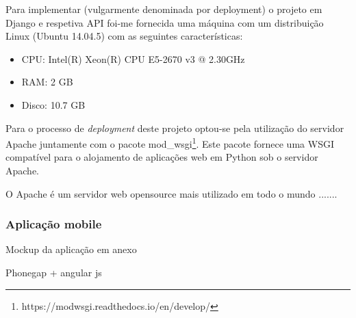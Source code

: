 Para implementar (vulgarmente denominada por deployment) o projeto em Django e respetiva API foi-me fornecida uma máquina com um distribuição Linux (Ubuntu 14.04.5) com as seguintes características: 

\begin{itemize}
	\item \ac{CPU}: Intel(R) Xeon(R) CPU E5-2670 v3 @ 2.30GHz
	\item \ac{RAM}: 2 GB
	\item Disco: 10.7 GB
\end{itemize}


Para o processo de \textit{deployment} deste projeto optou-se pela utilização do servidor Apache juntamente com o pacote mod\_wsgi\footnote{https://modwsgi.readthedocs.io/en/develop/}. 
Este pacote fornece uma \ac{WSGI} compatível para o alojamento de aplicações web em Python sob o servidor Apache. 

O Apache é um servidor web opensource mais utilizado em todo o mundo .......

\cite{TheApacheSoftwareFoundation2016}

























\subsubsection{Aplicação mobile}


Mockup da aplicação em anexo 

Phonegap + angular js


